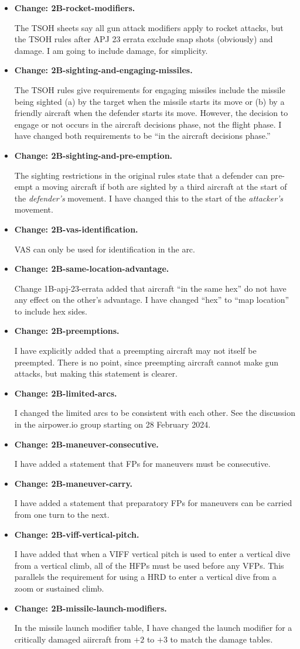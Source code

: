 \documentclass[10pt]{article}
\newcommand{\itemtag}[1]{\item \textbf{Change: #1.}\par}
\begin{document}
\begin{itemize}
    \itemtag{2B-rocket-modifiers} The TSOH sheets say all gun attack modifiers apply to rocket attacks, but the TSOH rules after APJ 23 errata exclude snap shots (obviously) and damage. I am going to include damage, for simplicity.

    \itemtag{2B-sighting-and-engaging-missiles} The TSOH rules give requirements for engaging missiles include the missile being sighted (a) by the target when the missile starts its move or (b) by a friendly aircraft when the defender starts its move. However, the decision to engage or not occurs in the aircraft decisions phase, not the flight phase. I have changed both requirements to be “in the aircraft decisions phase.”

    \itemtag{2B-sighting-and-pre-emption} The sighting restrictions in the original rules state that a defender can pre-empt a moving aircraft if both are sighted by a third aircraft at the start of the \emph{defender's} movement. I have changed this to the start of the \emph{attacker's} movement.

    \itemtag{2B-vas-identification} VAS can only be used for identification in the  arc.

    \itemtag{2B-same-location-advantage} Change 1B-apj-23-errata added that aircraft “in the same hex” do not have any effect on the other's advantage. I have changed “hex” to “map location” to include hex sides.

    \itemtag{2B-preemptions} I have explicitly added that a preempting aircraft may not itself be preempted. There is no point, since preempting aircraft cannot make gun attacks, but making this statement is clearer.

    \itemtag{2B-limited-arcs} I changed the limited arcs to be consistent with each other. See the discussion in the airpower.io group starting on 28 February 2024.

    \itemtag{2B-maneuver-consecutive} I have added a statement that FPs for maneuvers must be consecutive.

    \itemtag{2B-maneuver-carry} I have added a statement that preparatory FPs for maneuvers can be carried from one turn to the next.

    \itemtag{2B-viff-vertical-pitch} I have added that when a VIFF vertical pitch is used to enter a vertical dive from a vertical climb, all of the HFPs must be used before any VFPs. This parallels the requirement for using a HRD to enter a vertical dive from a zoom or sustained climb.

    \itemtag{2B-missile-launch-modifiers} In the missile launch modifier table, I have changed the launch modifier for a critically damaged aiircraft from $+2$ to $+3$ to match the damage tables.
    

\end{itemize}
\end{document}
